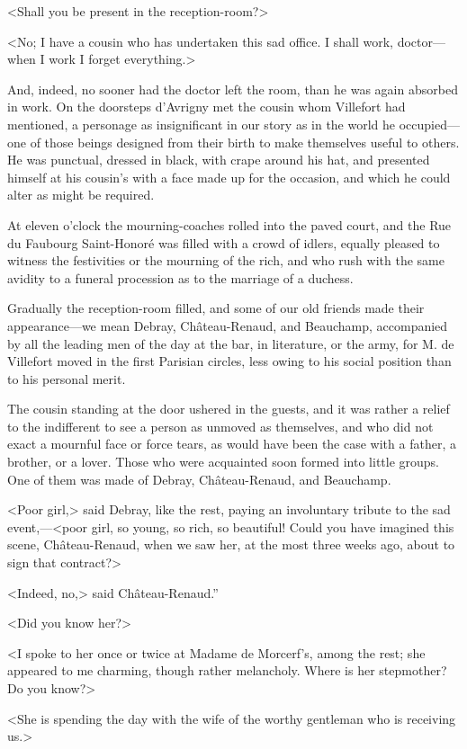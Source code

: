  <Shall you be present in the reception-room?> 

 <No; I have a cousin who has undertaken this sad office. I shall work, doctor—when I work I forget everything.> 

 And, indeed, no sooner had the doctor left the room, than he was again absorbed in work. On the doorsteps d'Avrigny met the cousin whom Villefort had mentioned, a personage as insignificant in our story as in the world he occupied—one of those beings designed from their birth to make themselves useful to others. He was punctual, dressed in black, with crape around his hat, and presented himself at his cousin's with a face made up for the occasion, and which he could alter as might be required. 

 At eleven o'clock the mourning-coaches rolled into the paved court, and the Rue du Faubourg Saint-Honoré was filled with a crowd of idlers, equally pleased to witness the festivities or the mourning of the rich, and who rush with the same avidity to a funeral procession as to the marriage of a duchess. 

 Gradually the reception-room filled, and some of our old friends made their appearance—we mean Debray, Château-Renaud, and Beauchamp, accompanied by all the leading men of the day at the bar, in literature, or the army, for M. de Villefort moved in the first Parisian circles, less owing to his social position than to his personal merit. 

 The cousin standing at the door ushered in the guests, and it was rather a relief to the indifferent to see a person as unmoved as themselves, and who did not exact a mournful face or force tears, as would have been the case with a father, a brother, or a lover. Those who were acquainted soon formed into little groups. One of them was made of Debray, Château-Renaud, and Beauchamp. 

 <Poor girl,> said Debray, like the rest, paying an involuntary tribute to the sad event,—<poor girl, so young, so rich, so beautiful! Could you have imagined this scene, Château-Renaud, when we saw her, at the most three weeks ago, about to sign that contract?> 

 <Indeed, no,> said Château-Renaud.” 

 <Did you know her?> 

 <I spoke to her once or twice at Madame de Morcerf's, among the rest; she appeared to me charming, though rather melancholy. Where is her stepmother? Do you know?> 

 <She is spending the day with the wife of the worthy gentleman who is receiving us.>

